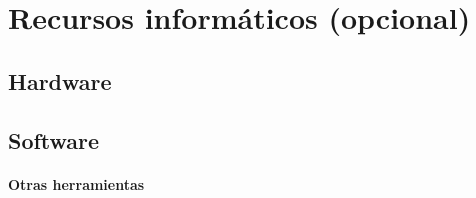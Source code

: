\chapter{Recursos informáticos (opcional)}

\section{Hardware}

\section{Software}

\subsubsection{Otras herramientas}

\bigskip